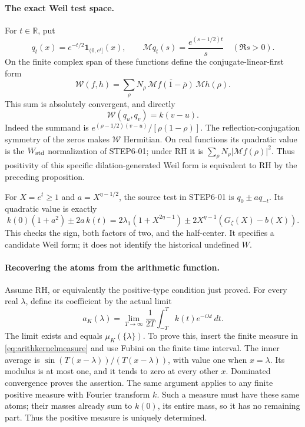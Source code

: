 \documentclass[11pt,a4paper]{article}
\newcommand{\R}{\mathbb R}
\newcommand{\fid}[1]{\textsf{#1}}
\begin{document}
\paragraph{The exact Weil test space.}
For \(t\in\R\), put
\[
 q_t(x)=e^{-t/2}\mathbf1_{(0,e^t]}(x),\qquad
 \mathcal Mq_t(s)=\frac{e^{(s-1/2)t}}s\quad(\Re s>0).
\]
On the finite complex span of these functions define the
conjugate-linear-first form
\[
 \mathcal W(f,h)=
 \sum_\rho N_\rho\,
 \overline{\mathcal Mf(1-\overline\rho)}\,\mathcal Mh(\rho).
\]
This sum is absolutely convergent, and directly
\begin{equation}\label{eq:arithkernelweilgram}
 \mathcal W(q_u,q_v)=k(v-u).
\end{equation}
Indeed the summand is
\(e^{(\rho-1/2)(v-u)}/[\rho(1-\rho)]\).
The reflection-conjugation symmetry of the zeros makes
\(\mathcal W\) Hermitian. On real functions its quadratic value is
the \(W_{\rm std}\) normalization of \fid{STEP6-01}; under RH it is
\(\sum_\rho N_\rho|\mathcal Mf(\rho)|^2\).
Thus positivity of this specific dilation-generated Weil form is
equivalent to RH by the preceding proposition.

For \(X=e^t\ge1\) and \(a=X^{\eta-1/2}\), the source test in
\fid{STEP6-01} is \(q_0\pm a q_{-t}\). Its quadratic value is exactly
\[
 k(0)(1+a^2)\pm2a\,k(t)
 =2\lambda_1(1+X^{2\eta-1})
 \pm2X^{\eta-1}(G_\zeta(X)-b(X)).
\]
This checks the sign, both factors of two, and the half-center.
It specifies a candidate Weil form; it does not identify the
historical undefined \(W\).

\paragraph{Recovering the atoms from the arithmetic function.}
Assume RH, or equivalently the positive-type condition just proved.
For every real \(\lambda\), define its coefficient by the actual limit
\begin{equation}\label{eq:arithkernelatom}
 a_K(\lambda)=
 \lim_{T\to\infty}\frac1{2T}
       \int_{-T}^{T}k(t)e^{-i\lambda t}\,dt.
\end{equation}
The limit exists and equals \(\mu_K(\{\lambda\})\). To prove this,
insert the finite measure in \eqref{eq:arithkernelmeasure} and use
Fubini on the finite time interval. The inner average is
\(\sin(T(x-\lambda))/(T(x-\lambda))\), with value one when
\(x=\lambda\). Its modulus is at most one, and it tends to zero
at every other \(x\). Dominated convergence proves the assertion.
The same argument applies to any finite positive measure with Fourier
transform \(k\). Such a measure must have these same atoms; their
masses already sum to \(k(0)\), its entire mass, so it has no
remaining part. Thus the positive measure is uniquely determined.
\end{document}
